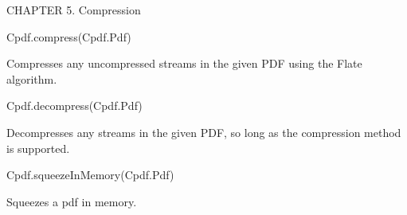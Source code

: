 CHAPTER 5. Compression

Cpdf.compress(Cpdf.Pdf)

Compresses any uncompressed streams in the given PDF using the Flate algorithm.

Cpdf.decompress(Cpdf.Pdf)

Decompresses any streams in the given PDF, so long as the compression method is
supported.

Cpdf.squeezeInMemory(Cpdf.Pdf)

Squeezes a pdf in memory.
